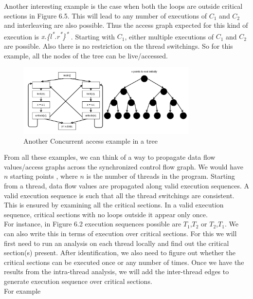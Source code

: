 Another interesting example is the case when both the loops are outside critical sections in Figure 6.5. This will lead to any number of executions of $C_1$ and $C_2$ and interleaving are also possible. Thus the access graph expected for this kind of execution is \emph{x.\{l\textsuperscript{*}.r\textsuperscript{*}\}\textsuperscript{*}} . Starting with $C_1$, either multiple executions of $C_1$ and $C_2$ are possible. Also there is no restriction on the thread switchings. So for this example, all the nodes of the tree can be live/accessed. \\

\begin{figure}
	\centering
	\includegraphics[width=0.8\textwidth]{Figures/tree4.png}
	\caption{Another Concurrent access example in a tree}
	\label{fig:ch5example}
\end{figure}

From all these examples, we can think of a way to propagate data flow values/access graphs across the synchronized control flow graph. We would have $n$ starting points , where $n$ is the number of threads in the program. Starting from a thread, data flow values are propagated along valid execution sequences. A valid execution sequence is such that all the thread switchings are consistent. This is ensured by examining all the critical sections. In a valid execution sequence, critical sections with no loops outside it appear only once. \\

For instance, in Figure 6.2 execution sequences possible are $T_1$,$T_2$ or $T_2$,$T_1$. We can also write this in terms of execution over critical sections. For this we will first need to run an analysis on each thread locally and find out the critical section(s) present. After identification, we also need to figure out whether the critical sections can be executed once or any number of times. Once we have the results from the intra-thread analysis, we will add the inter-thread edges to generate execution sequence over critical sections. \\

For example